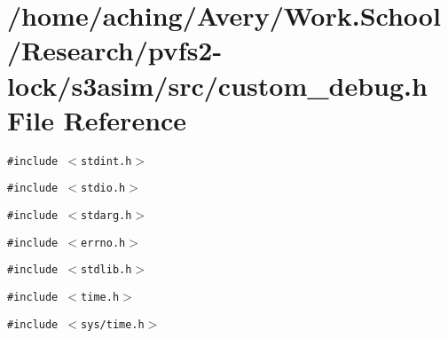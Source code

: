 \section{/home/aching/Avery/Work.School/Research/pvfs2-lock/s3asim/src/custom\_\-debug.h File Reference}
\label{custom__debug_8h}
{\tt \#include $<$stdint.h$>$}\par
{\tt \#include $<$stdio.h$>$}\par
{\tt \#include $<$stdarg.h$>$}\par
{\tt \#include $<$errno.h$>$}\par
{\tt \#include $<$stdlib.h$>$}\par
{\tt \#include $<$time.h$>$}\par
{\tt \#include $<$sys/time.h$>$}\par
